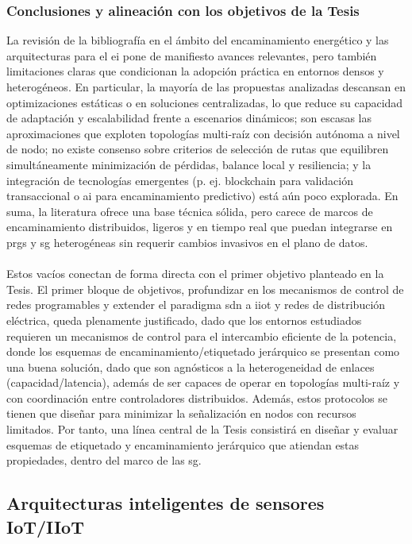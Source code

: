 \subsubsection{Conclusiones y alineación con los objetivos de la Tesis}
\label{subsubsec:conclu_sg}
La revisión de la bibliografía en el ámbito del encaminamiento energético y las arquitecturas para el \gls{ei} pone de manifiesto avances relevantes, pero también limitaciones claras que condicionan la adopción práctica en entornos densos y heterogéneos. En particular, la mayoría de las propuestas analizadas descansan en optimizaciones estáticas o en soluciones centralizadas, lo que reduce su capacidad de adaptación y escalabilidad frente a escenarios dinámicos; son escasas las aproximaciones que exploten topologías multi-raíz con decisión autónoma a nivel de nodo; no existe consenso sobre criterios de selección de rutas que equilibren simultáneamente minimización de pérdidas, balance local y resiliencia; y la integración de tecnologías emergentes (p. ej. blockchain para validación transaccional o \gls{ai} para encaminamiento predictivo) está aún poco explorada. En suma, la literatura ofrece una base técnica sólida, pero carece de marcos de encaminamiento distribuidos, ligeros y en tiempo real que puedan integrarse en \glspl{prg} y \gls{sg} heterogéneas sin requerir cambios invasivos en el plano de datos.\\
\\
Estos vacíos conectan de forma directa con el primer objetivo planteado en la Tesis. El primer bloque de objetivos, profundizar en los mecanismos de control de redes programables y extender el paradigma \gls{sdn} a \gls{iiot} y redes de distribución eléctrica, queda plenamente justificado, dado que los entornos estudiados requieren un mecanismos de control para el intercambio eficiente de la potencia, donde los esquemas de encaminamiento/etiquetado jerárquico se presentan como una buena solución, dado que son agnósticos a la heterogeneidad de enlaces (capacidad/latencia), además de ser capaces de operar en topologías multi-raíz y con coordinación entre controladores distribuidos. Además, estos protocolos se tienen que diseñar para minimizar la señalización en nodos con recursos limitados. Por tanto, una línea central de la Tesis consistirá en diseñar y evaluar esquemas de etiquetado y encaminamiento jerárquico que atiendan estas propiedades, dentro del marco de las \gls{sg}.



\subsection{Arquitecturas inteligentes de sensores IoT/IIoT}
\label{subsec:iiotarch}

